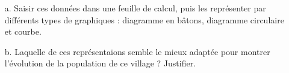 \documentclass[12pt]{article}
\newcommand{\Pointille}[1][3]{\multido{}{#1}{ \makebox[\linewidth]{\dotfill}\\[\parskip]}}
\begin{document}
\begin{enumerate}
\item[a.] Saisir ces données dans une feuille de calcul, puis les représenter par différents types de graphiques : diagramme en bâtons, diagramme circulaire et courbe.
\item[b.] Laquelle de ces représentaions semble le mieux adaptée pour montrer l'évolution de la population de ce village ? Justifier. \\
\end{enumerate}

\Pointille[5] \\
\end{document}
